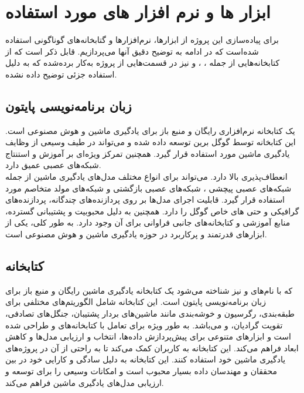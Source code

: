 \section{ابزار ها و نرم افزار های مورد استفاده}
برای پیاده‌سازی این پروژه از ابزار‌ها، نرم‌افزار‌ها و گتابخانه‌های گوناگونی استفاده شده‌است که در ادامه به توضیح دقیق آنها می‌پردازیم. قابل ذکر است که از کتابخانه‌هایی از جمله ، ،  و  نیز در قسمت‌هایی از پروژه به‌کار برده‌شده که به دلیل استفاده جزئی توضیح داده نشده.

\subsection{زبان برنامه‌نویسی پایتون}

 یک کتابخانه نرم‌افزاری رایگان و منبع باز برای یادگیری ماشین و هوش مصنوعی است. این کتابخانه توسط گوگل برین توسعه داده شده و می‌تواند در طیف وسیعی 
از وظایف یادگیری ماشین مورد استفاده قرار گیرد. همچنین تمرکز ویژه‌ای بر آموزش و استنتاج شبکه‌های عصبی عمیق دارد. 
\\
 انعطاف‌پذیری بالا دارد. می‌تواند برای انواع مختلف مدل‌های یادگیری ماشین از جمله شبکه‌های عصبی پیچشی ، شبکه‌های عصبی بازگشتی  و شبکه‌های مولد متخاصم  مورد استفاده قرار گیرد.
 قابلیت اجرای مدل‌ها بر روی پردازنده‌های چندگانه، پردازنده‌های گرافیکی  و حتی های خاص گوگل را دارد. همچنین به دلیل محبوبیت و پشتیبانی گسترده،
منابع آموزشی و کتابخانه‌های جانبی فراوانی برای آن وجود دارد. به طور کلی،  یکی از ابزارهای قدرتمند و پرکاربرد در حوزه یادگیری ماشین و هوش مصنوعی است.

\subsection{کتابخانه }
 که با نام‌های  و  نیز شناخته می‌شود یک کتابخانه یادگیری ماشین رایگان و منبع باز برای زبان برنامه‌نویسی پایتون است. این کتابخانه شامل الگوریتم‌های مختلفی برای طبقه‌بندی،
رگرسیون و خوشه‌بندی مانند ماشین‌های بردار پشتیبان، جنگل‌های تصادفی، تقویت گرادیان،  و  می‌باشد.  به طور ویژه برای تعامل با
کتابخانه‌های  و  طراحی شده است و ابزارهای متنوعی برای پیش‌پردازش داده‌ها، انتخاب و ارزیابی مدل‌ها و کاهش ابعاد فراهم می‌کند. این کتابخانه به کاربران کمک می‌کند تا به راحتی از آن در پروژه‌های 
یادگیری ماشین خود استفاده کنند. این کتابخانه به دلیل سادگی و کارایی خود در بین محققان و مهندسان داده بسیار محبوب است و امکانات وسیعی را برای توسعه و ارزیابی مدل‌های یادگیری ماشین فراهم می‌کند.

